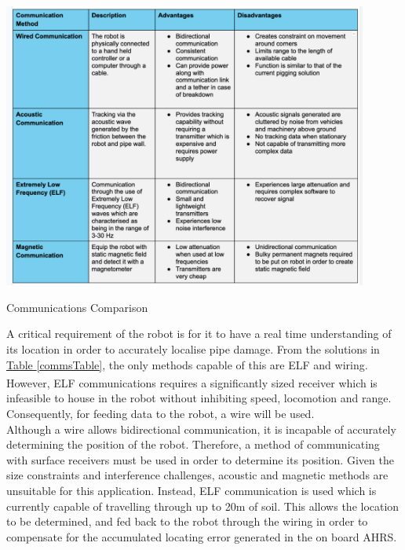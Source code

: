 \documentclass[11pt]{article}		%
\newcommand{\supercite}[1]{\textsuperscript{\cite{#1}}}		%
\newcommand{\tableref}[1]{\hyperref[#1]{Table \ref*{#1}}}     %
\begin{document}
	        \begin{table}[h]
				\centering
				\includegraphics[width=0.9\textwidth]{commscomparison}
				\caption{Communications Comparison}
				\label{commsTable}
			\end{table}
			
	     	A critical requirement of the robot is for it to have a real time understanding of its location in order to accurately localise pipe damage. 
	     	From the solutions in \tableref{commsTable}, the only methods capable of this are ELF and wiring. 
	     	However, ELF communications requires a significantly sized receiver\supercite{elfreceiversize} which is infeasible to house in the robot without inhibiting speed, locomotion and range. 
	     	Consequently, for feeding data to the robot, a wire will be used.
	        \\ 
	        \hspace*{3ex}Although a wire allows bidirectional communication, it is incapable of accurately determining the position of the robot. 
	        Therefore, a method of communicating with surface receivers must be used in order to determine its position. 
	        Given the size constraints and interference challenges, acoustic and magnetic methods are unsuitable for this application. 
	        Instead, ELF communication is used which is currently capable of travelling through up to 20m of soil. 
	        This allows the location to be determined, and fed back to the robot through the wiring in order to compensate for the accumulated locating error generated in the on board AHRS.
	         
\end{document}
